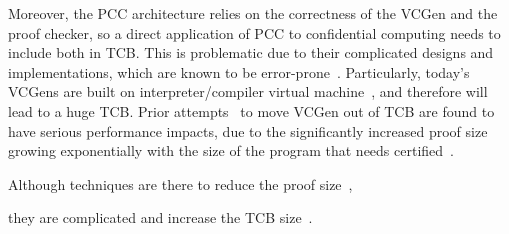 Moreover, the PCC architecture relies on the correctness of the VCGen and the proof checker, so a direct application of PCC to confidential computing needs to include both in TCB. This is problematic due to their complicated designs and implementations, which are known to be error-prone~\cite{necula2001oracle}. Particularly, today's VCGens are built on \DIFaddbegin {}\DIFaddend interpreter/compiler \DIFdelbegin {}\DIFdelend \DIFaddbegin {}\DIFaddend virtual machine~\cite{leroy2006formal}, and therefore will lead to a huge TCB. Prior attempts~\cite{appel2001foundational} to move VCGen out of TCB are found to have serious performance impacts, due to the significantly increased proof size growing exponentially with the size of the program that needs \DIFaddbegin {}\DIFaddend certified~\cite{necula1997proof}.  Although techniques are there to reduce the proof size~\cite{appel2001foundational,pirzadeh2010extended}, they are complicated and increase the TCB size~\cite{appel2003trustworthy}. 
